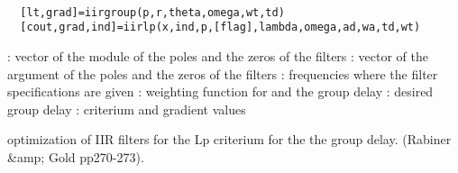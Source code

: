 
\begin{mandesc}
   \\ %
\end{mandesc}
\begin{calling_sequence}
\begin{verbatim}
  [lt,grad]=iirgroup(p,r,theta,omega,wt,td)  
  [cout,grad,ind]=iirlp(x,ind,p,[flag],lambda,omega,ad,wa,td,wt)  
\end{verbatim}
\end{calling_sequence}
\begin{parameters}
  \begin{varlist}
    : vector of the module of the poles and the zeros of the filters
    : vector of the argument of the poles and the zeros of the filters
    : frequencies where the filter specifications are given
    : weighting function for and the group delay
    : desired group delay
    : criterium and gradient values
  \end{varlist}
\end{parameters}
\begin{mandescription}
  optimization of IIR filters for the Lp criterium for the
  the group delay. (Rabiner \&amp; Gold pp270-273).
\end{mandescription}
